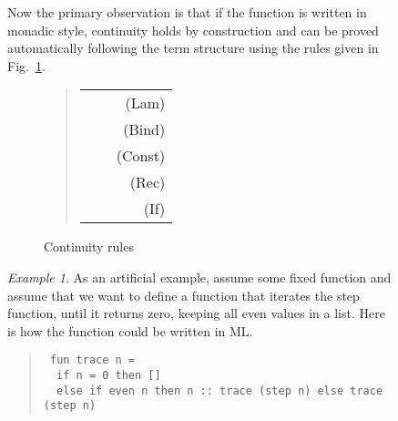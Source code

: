 \documentclass[copyright,creativecommons,sharealike]{eptcs}
\theoremstyle{remark}
\newtheorem{example}{Example}
\begin{document}
\begin{isabellebody}
\begin{isamarkuptext}
\begin{figure}
  Now the primary observation is that if the function is
  written in monadic style, continuity holds by construction and can be proved 
  automatically following the term structure using the rules given in Fig.~\ref{fig:cont}.
  \begin{figure}
  \begin{quote}
  \begin{tabular}{lcr}
  \isa{{\isacharparenleft}{\isasymAnd}y{\isachardot}\ cont\ {\isacharparenleft}{\isasymlambda}x{\isachardot}\ f\ x\ y{\isacharparenright}{\isacharparenright}\ {\isasymLongrightarrow}\ cont\ f}&&{\sc (Lam)}\\
  \isa{cont\ f\ {\isasymLongrightarrow}\ {\isacharparenleft}{\isasymAnd}y{\isachardot}\ cont\ {\isacharparenleft}g\ y{\isacharparenright}{\isacharparenright}\ {\isasymLongrightarrow}\ cont\ {\isacharparenleft}{\isasymlambda}x{\isachardot}\ do\ y\ {\isasymleftarrow}\ f\ x{\isacharsemicolon}\ g\ y\ x\ done{\isacharparenright}}&&{\sc (Bind)}\\
  \isa{cont\ {\isacharparenleft}{\isasymlambda}x{\isachardot}\ c{\isacharparenright}}&& {\sc (Const)}\\
  \isa{cont\ {\isacharparenleft}{\isasymlambda}f{\isachardot}\ f\ x{\isacharparenright}}&& {\sc (Rec)}\\
  \isa{cont\ f\ {\isasymLongrightarrow}\ cont\ g\ {\isasymLongrightarrow}\ cont\ {\isacharparenleft}{\isasymlambda}x{\isachardot}\ if\ b\ then\ f\ x\ else\ g\ x{\isacharparenright}}&& {\sc (If)}
  \end{tabular}
  \end{quote}
  \caption{Continuity rules}\label{fig:cont}
  \end{figure}

  \begin{example}As an artificial example,
  assume some fixed function 
  and assume that we want to define a function 
   that iterates the step
  function, until it returns zero, keeping all even values in a list.
  Here is how the function could be written in ML.\newpage

  \begin{quote}\upshape\tt
  fun trace n = \\
  \mbox{}~~if n = 0 then []\\
  \mbox{}~~else if even n then n ::~trace (step n) else trace (step n)
  \end{quote}\end{example}


\end{figure}
\end{isamarkuptext}
\end{isabellebody}
\end{document}
